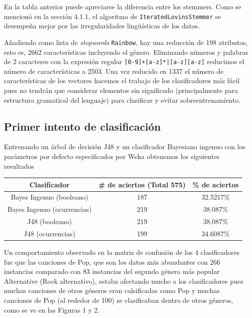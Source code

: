 \documentclass[spanish,11pt,letterpaper]{article}
\begin{document}
En la tabla anterior puede apreciarse la diferencia entre los stemmers. Como se
mencionó en la sección 4.1.1, el algoritmo de \texttt{IteratedLovinsStemmer}
se desempeña mejor por las irregularidades lingüísticas de los datos.

Añadiendo como lista de \textit{stopwords} \texttt{Rainbow}, hay una reducción de
198 atributos, esto es, 2662 características incluyendo el género. Eliminando números
y palabras de 2 caracteres con la expresión regular \texttt{[0-9]+[a-z]*|[a-z][a-z]}
reducimos el número de características a 2503. Una vez reducido en 1337 el número de
características de los vectores hacemos el trabajo de los clasificadores más
fácil pues no tendrán que considerar elementos sin significado (principalmente
para estructura gramatical del lenguaje) para clasificar y evitar sobreentrenamiento.

\subsection{Primer intento de clasificación}

Entrenando un árbol de decisión J48 y un clasificador Bayesiano ingenuo con los
parámetros por defecto especificados por Weka obtenemos los siguientes resultados

\begin{center}
\begin{tabular}{c | c | c}
Clasificador &  \# de aciertos (Total 575) & \% de aciertos \\
\hline
Bayes Ingenuo (booleano) & 187 & 32.5217\% \\
Bayes Ingenuo (ocurrencias) & 219 & 38.087\% \\
J48 (booleano) & 219 & 38.087\% \\
J48 (ocurrencias) & 199 & 34.6087\%
\end{tabular}
\end{center}

Un comportamiento observado en la matriz de confusión de los 4 clasificadores fue
que las canciones de Pop, que son los datos más abundantes con 266 instancias comparado
con 83 instancias del segundo género más popular Alternative (Rock alternativo),
estaba afectando mucho a los clasificadores pues muchas canciones de otros géneros
eran calsificadas como Pop y muchas canciones de Pop (al rededor de 100) se
clasificaban dentro de otros géneros, como se ve en las Figuras 1 y 2.
\end{document}

